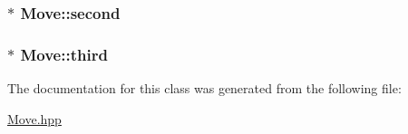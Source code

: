 \hypertarget{class_move_ad2edb78f2d4533cdbc4d8f4ac5909d3f}{
\subsubsection[{second}]{$\ast$ Move\-::second}}\label{class_move_ad2edb78f2d4533cdbc4d8f4ac5909d3f}
\hypertarget{class_move_a255842251c3916ea715d5093797028c1}{
\subsubsection[{third}]{$\ast$ Move\-::third}}\label{class_move_a255842251c3916ea715d5093797028c1}


The documentation for this class was generated from the following file\-:\begin{DoxyCompactItemize}
\item 
\hyperlink{_move_8hpp}{Move.\-hpp}\end{DoxyCompactItemize}
